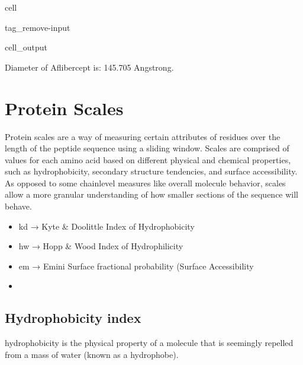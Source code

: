 \documentclass[letterpaper,10pt,english]{jupyterBook}
\begin{document}
\begin{sphinxuseclass}{cell}
\begin{sphinxuseclass}{tag_remove-input}\begin{sphinxVerbatimOutput}

\begin{sphinxuseclass}{cell_output}
\begin{sphinxVerbatim}[commandchars=\\\{\}]
\PYGZsh{} Diameter of Aflibercept is: \PYGZhy{}\PYGZhy{}\PYGZhy{}\PYGZhy{}\PYGZhy{}\PYGZhy{}\PYGZhy{}\PYGZhy{}\PYGZhy{}\PYGZhy{}\PYGZhy{}\PYGZhy{}\PYGZhy{}\PYGZhy{}\PYGZhy{}\PYGZhy{}\PYGZhy{}\PYGZhy{}\PYGZhy{}\PYGZhy{}\PYGZhy{}\PYGZhy{}\PYGZhy{}145.705 Angstrong.
\end{sphinxVerbatim}

\end{sphinxuseclass}\end{sphinxVerbatimOutput}

\end{sphinxuseclass}
\end{sphinxuseclass}

\section{Protein Scales}
\label{\detokenize{ipynb/chapter1:protein-scales}}
\sphinxAtStartPar
Protein scales are a way of measuring certain attributes of residues over the length of the peptide sequence using a sliding window. Scales are comprised of values for each amino acid based on different physical and chemical properties, such as hydrophobicity, secondary structure tendencies, and surface accessibility. As opposed to some chain\sphinxhyphen{}level measures like overall molecule behavior, scales allow a more granular understanding of how smaller sections of the sequence will behave.
\begin{itemize}
\item {} 
\sphinxAtStartPar
kd → Kyte \& Doolittle Index of Hydrophobicity

\item {} 
\sphinxAtStartPar
hw → Hopp \& Wood Index of Hydrophilicity

\item {} 
\sphinxAtStartPar
em → Emini Surface fractional probability (Surface Accessibility

\item {} 
\end{itemize}


\subsection{Hydrophobicity index}
\label{\detokenize{ipynb/chapter1:hydrophobicity-index}}
\sphinxAtStartPar
hydrophobicity is the physical property of a molecule that is seemingly repelled from a mass of water (known as a hydrophobe).
\end{document}
